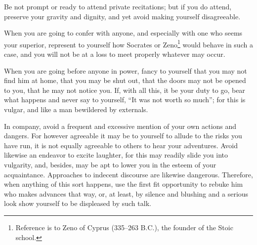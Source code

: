 Be not  prompt or ready  to attend private recitations;  but if you  do attend,
preserve your gravity and dignity, and yet avoid making yourself disagreeable.

When you  are going to  confer with anyone, and  especially with one  who seems
your superior, represent to yourself how Socrates or Zeno\footnote{Reference is
to Zeno  of Cyprus  (335--263 B.C.),  the founder of  the Stoic  school.} would
behave in such a case, and you will  not be at a loss to meet properly whatever
may occur.

When you are going  before anyone in power, fancy to yourself  that you may not
find him at home, that you may be shut out, that the doors may not be opened to
you, that he may not notice you. If, with all this, it be your duty to go, bear
what happens and never say to yourself,  ``It was not worth so much''; for this
is vulgar, and like a man bewildered by externals.

In company,  avoid a  frequent and  excessive mention of  your own  actions and
dangers. For however agreeable it may be to yourself to allude to the risks you
have run, it is not equally agreeable  to others to hear your adventures. Avoid
likewise  an endeavor  to  excite  laughter, for  this  may  readily slide  you
into  vulgarity, and,  besides,  may be  apt  to  lower you  in  the esteem  of
your  acquaintance. Approaches  to indecent  discourse are  likewise dangerous.
Therefore, when anything of this sort happens, use the first fit opportunity to
rebuke him who makes  advances that way, or, at least,  by silence and blushing
and a serious look show yourself to be displeased by such talk.
